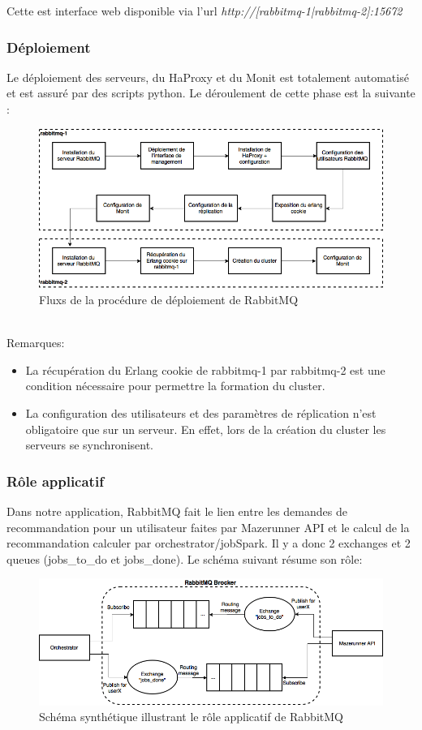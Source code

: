 Cette est interface web disponible via l'url \textit{http://[rabbitmq-1|rabbitmq-2]:15672}

\subsubsection{Déploiement}

Le déploiement des serveurs, du HaProxy et du Monit est totalement automatisé et est assuré par des scripts python. Le déroulement de cette phase est la suivante :
\ \\
\begin{figure}[h]
    \centering
    \includegraphics[scale=0.4]{pics/rabbitmq_deploy.png}
    \caption{Fluxs de la procédure de déploiement de RabbitMQ}
\end{figure}
\ \\
Remarques:
\begin{itemize}
	\item La récupération du Erlang cookie de rabbitmq-1 par rabbitmq-2 est une condition nécessaire pour permettre la formation du cluster.
	\item La configuration des utilisateurs et des paramètres de réplication n'est obligatoire que sur un serveur. En effet, lors de la création du cluster les serveurs se synchronisent.
\end{itemize}

\subsubsection{Rôle applicatif}

Dans notre application, RabbitMQ fait le lien entre les demandes de recommandation pour un utilisateur faites par Mazerunner API et le calcul de la recommandation calculer par orchestrator/jobSpark. Il y a donc 2 exchanges et 2 queues (jobs\_to\_do et jobs\_done). Le schéma suivant résume son rôle:
\ \\
\begin{figure}[h]
    \centering
    \includegraphics[scale=0.4]{pics/rabbitmq_role.png}
    \caption{Schéma synthétique illustrant le rôle applicatif de RabbitMQ}
\end{figure}
\FloatBarrier